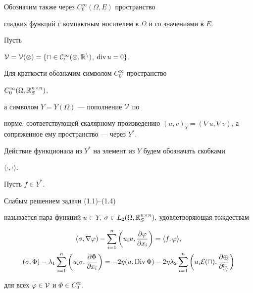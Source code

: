 Обозначим также через $C^{\infty}_0(\Omega, E)$ пространство


гладких функций с компактным носителем в $\Omega$ и со значениями в $E$.





Пусть


$\cal{V}=\cal{V}(\Omega)= \{u \in C^{\infty}_0(\Omega,


\Bbb{R}^n)$, $\dv u = 0 \}$.





Для краткости обозначим символом $C^{\infty}_0$ пространство


$C^{\infty}_0(\Omega, \Bbb{R}^{n\times n}_S)$, 


а символом $Y=Y(\Omega)$ --- пополнение $\cal{V}$ по


норме, соответствующей скалярному произведению $(u,v)_Y=(\nabla u,


\nabla v)$, а сопряженное ему пространство --- через $Y^*$.


Действие функционала из $Y^*$ на элемент из $Y$ будем обозначать скобками


$\langle\cdot,\cdot\rangle$.





Пусть $f\in Y^*$.





\begin{defnnonum}


Слабым решением задачи (1.1)--(1.4)


называется пара функций $u\in Y$, $\sigma\in L_2(\Omega,


\Bbb{R}^{n\times n}_S),$ удовлетворяющая тождествам


\begin{gather}


(\sigma,\nabla\varphi)-\sum^n_{i=1}\bigg(u_i u,\frac


{\partial\varphi}{\partial x_i}\bigg)=\langle f, \varphi\rangle,\\


%


(\sigma, \Phi)-\lambda_1\sum^n_{i=1}\bigg(u_i \sigma, \frac


{\partial\Phi}{\partial x_i}\bigg)=


-2\eta(u,\Div\Phi)-2\eta\lambda_2\sum^n_{i=1}\bigg(u_i\cal{E}(u),\frac


{\partial\Phi}{\partial x_i}\bigg)


\end{gather}


для всех $\varphi\in\cal{V}$ и $\Phi\in C^{\infty}_0$.


\end{defnnonum}





